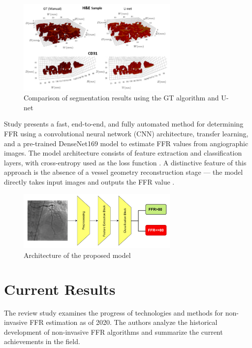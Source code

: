 \documentclass[default]{subfiles}
\begin{document}
\begin{figure}[H]
    \centering
    \includegraphics[width=0.7\textwidth]{image/pic3.png}
    \caption{Comparison of segmentation results using the GT algorithm and U-net
    \cite{ramakrishnan2023vessels, kohl_2019}}
\end{figure}

Study \cite{arefinia2024deepffr} presents a fast, end-to-end, and fully automated method for determining FFR using a
convolutional neural network (CNN) architecture, transfer learning, and a pre-trained DenseNet169 model to estimate FFR
values from angiographic images. The model architecture consists of feature extraction and classification layers, with
cross-entropy used as the loss function \cite{arefinia_2024}. A distinctive feature of this approach is the absence of
a vessel geometry reconstruction stage — the model directly takes input images and outputs the FFR value
\cite{wang_2019, mineo_2024}.

\begin{figure}[H]
    \centering
    \includegraphics[width=0.7\textwidth]{image/pic4.png}
    \caption{Architecture of the proposed model \cite{arefinia2024deepffr}}
\end{figure}

\section{Current Results}

The review study \cite{khav2020ctffr} examines the progress of technologies and methods for non-invasive FFR estimation
as of 2020. The authors analyze the historical development of non-invasive FFR algorithms and summarize the current
achievements in the field.
\end{document}
